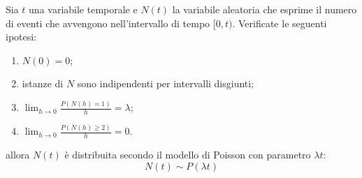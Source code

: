 \begin{teor}
	Sia $t$ una variabile temporale e $N(t)$ la variabile aleatoria che esprime il numero di eventi che avvengono nell'intervallo di tempo $[0,t)$. Verificate le seguenti ipotesi:
	\begin{enumerate}
		\item $N(0)=0$;
		\item istanze di $N$ sono indipendenti per intervalli disgiunti;
		\item $\displaystyle\lim_{h\to0}\frac{P(N(h)=1)}{h}=\lambda$;
		\item $\displaystyle\lim_{h\to0}\frac{P(N(h)\geq 2)}{h}=0$.
	\end{enumerate}
	allora $N(t)$ è distribuita secondo il modello di Poisson con parametro $\lambda t$:
	\begin{equation*}
		N(t)\sim P(\lambda t)
	\end{equation*}
\end{teor}

